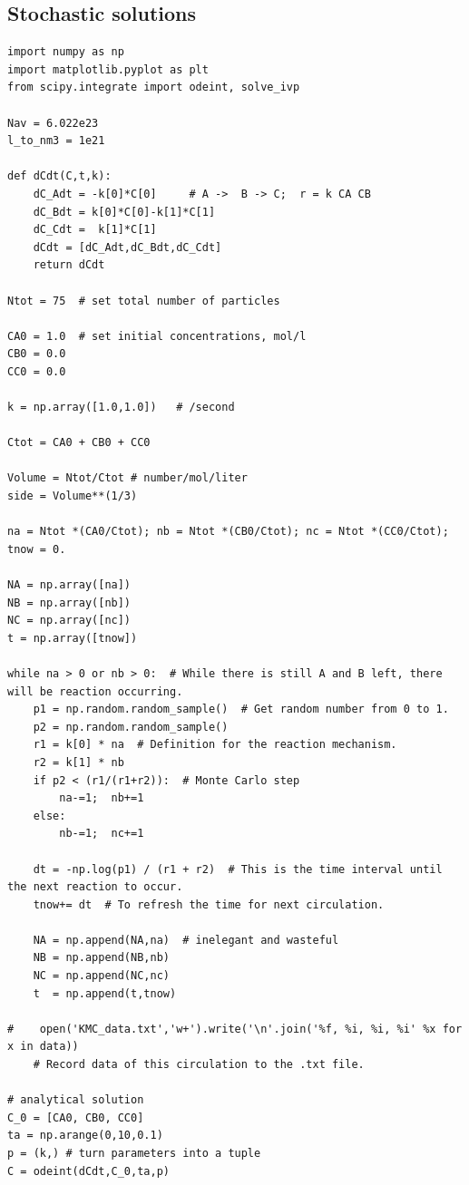 \documentclass[11pt]{article}
\begin{document}
\subsection{Stochastic solutions}
\label{sec:org9e9b003}

\begin{verbatim}
import numpy as np
import matplotlib.pyplot as plt 
from scipy.integrate import odeint, solve_ivp

Nav = 6.022e23
l_to_nm3 = 1e21

def dCdt(C,t,k):
    dC_Adt = -k[0]*C[0]     # A ->  B -> C;  r = k CA CB
    dC_Bdt = k[0]*C[0]-k[1]*C[1]
    dC_Cdt =  k[1]*C[1]
    dCdt = [dC_Adt,dC_Bdt,dC_Cdt] 
    return dCdt

Ntot = 75  # set total number of particles

CA0 = 1.0  # set initial concentrations, mol/l
CB0 = 0.0
CC0 = 0.0

k = np.array([1.0,1.0])   # /second

Ctot = CA0 + CB0 + CC0

Volume = Ntot/Ctot # number/mol/liter
side = Volume**(1/3)

na = Ntot *(CA0/Ctot); nb = Ntot *(CB0/Ctot); nc = Ntot *(CC0/Ctot); tnow = 0.

NA = np.array([na])
NB = np.array([nb])
NC = np.array([nc])
t = np.array([tnow])

while na > 0 or nb > 0:  # While there is still A and B left, there will be reaction occurring.
    p1 = np.random.random_sample()  # Get random number from 0 to 1.
    p2 = np.random.random_sample()
    r1 = k[0] * na  # Definition for the reaction mechanism.
    r2 = k[1] * nb
    if p2 < (r1/(r1+r2)):  # Monte Carlo step
        na-=1;  nb+=1
    else:
        nb-=1;  nc+=1

    dt = -np.log(p1) / (r1 + r2)  # This is the time interval until the next reaction to occur.
    tnow+= dt  # To refresh the time for next circulation.
    
    NA = np.append(NA,na)  # inelegant and wasteful
    NB = np.append(NB,nb)
    NC = np.append(NC,nc)
    t  = np.append(t,tnow)

#    open('KMC_data.txt','w+').write('\n'.join('%f, %i, %i, %i' %x for x in data))
    # Record data of this circulation to the .txt file.

# analytical solution
C_0 = [CA0, CB0, CC0]
ta = np.arange(0,10,0.1) 
p = (k,) # turn parameters into a tuple
C = odeint(dCdt,C_0,ta,p)


\end{verbatim}
\end{document}
